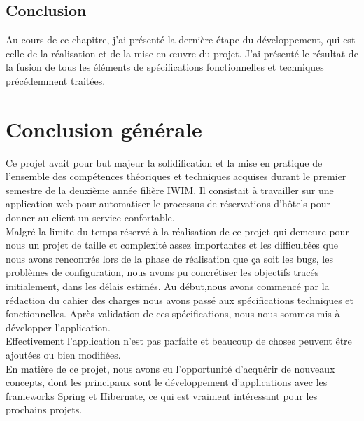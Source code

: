 \documentclass[12pt,a4paper]{report}
\begin{document}
	 
				
	\section{Conclusion}
Au cours de ce chapitre, j'ai présenté la dernière étape du développement, qui est
celle de la réalisation et de la mise en œuvre du projet. J'ai présenté le résultat de la fusion
de tous les éléments de spécifications fonctionnelles et techniques précédemment traitées.





		\chapter*{Conclusion générale} 
	Ce projet avait pour but majeur la solidification et la mise en
pratique de l’ensemble des compétences théoriques et techniques acquises durant le premier semestre de la deuxième année filière IWIM. Il
consistait à travailler sur une application web pour automatiser le processus de réservations d'hôtels pour donner au client un service confortable.\\
Malgré la limite du temps réservé à la réalisation de ce projet qui demeure pour nous un projet
de taille et complexité assez importantes et les difficultées que nous avons rencontrés lors de la phase de réalisation que ça soit les bugs, les problèmes de configuration, nous avons pu concrétiser les objectifs tracés initialement, dans les délais estimés. Au début,nous avons commencé par la rédaction du cahier des charges nous avons passé aux
spécifications techniques et fonctionnelles. Après validation de ces spécifications, nous nous sommes mis à développer l'application.\\
Effectivement l'application n'est pas parfaite et beaucoup de choses peuvent être ajoutées ou bien modifiées.\\
En matière de ce projet, nous avons eu l’opportunité d’acquérir de nouveaux concepts, dont les principaux sont le développement d'applications avec les frameworks Spring et Hibernate, ce qui est vraiment intéressant pour les prochains projets.\\
	
\end{document}
